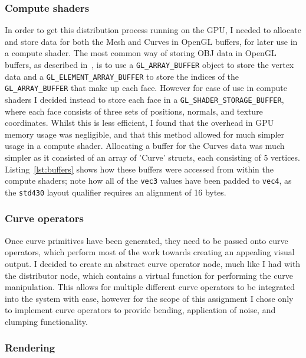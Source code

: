 \documentclass[]{acmsiggraph}
\begin{document}
\subsubsection{Compute shaders} \label{sec:compute shaders}

In order to get this distribution process running on the GPU, I needed to allocate and store data for both the Mesh and Curves in OpenGL buffers, for later use in a compute shader. The most common way of storing OBJ data in OpenGL buffers, as described in~\cite{objLoading}, is to use a \verb|GL_ARRAY_BUFFER| object to store the vertex data and a \verb|GL_ELEMENT_ARRAY_BUFFER| to store the indices of the \verb|GL_ARRAY_BUFFER| that make up each face. However for ease of use in compute shaders I decided instead to store each face in a \verb|GL_SHADER_STORAGE_BUFFER|, where each face consists of three sets of positions, normals, and texture coordinates. Whilst this is less efficient, I found that the overhead in GPU memory usage was negligible, and that this method allowed for much simpler usage in a compute shader. Allocating a buffer for the Curves data was much simpler as it consisted of an array of 'Curve' structs, each consisting of 5 vertices. Listing~\ref{lst:buffers} shows how these buffers were accessed from within the compute shaders; note how all of the \texttt{vec3} values have been padded to \texttt{vec4}, as the \texttt{std430} layout qualifier requires an alignment of 16 bytes.

\subsubsection{Curve operators} \label{sec:operators}

Once curve primitives have been generated, they need to be passed onto curve operators, which perform most of the work towards creating an appealing visual output. I decided to create an abstract curve operator node, much like I had with the distributor node, which contains a virtual function for performing the curve manipulation. This allows for multiple different curve operators to be integrated into the system with ease, however for the scope of this assignment I chose only to implement curve operators to provide bending, application of noise, and clumping functionality.

\subsubsection{Rendering} \label{sec:rendering}
\end{document}
